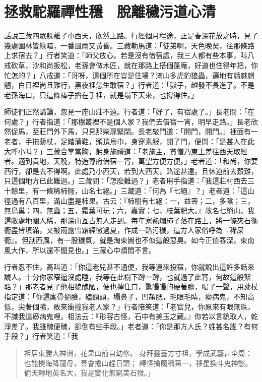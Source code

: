 
\chapter{拯救駝羅禪性穩　脫離穢污道心清}

話說三藏四眾躲離了小西天，欣然上路。行經個月程途，正是春深花放之時，見了幾處園林皆綠暗，一番風雨又黃昏。三藏勒馬道：「徒弟啊，天色晚矣，往那條路上求宿去？」行者笑道：「師父放心。若是沒有借宿處，我三人都有些本事，叫八戒砍草，沙和尚扳松，老孫會做木匠，就在那路上搭個蓬庵，好道也住得年把，你忙怎的？」八戒道：「哥呀，這個所在豈是住場？滿山多虎豹狼蟲，遍地有魑魅魍魎，白日裡尚且難行，黑夜裡怎生敢宿？」行者道：「獃子，越發不長進了。不是老孫海口，只這條棒子揝在手裡，就是塌下天來，也撐得住。」

師徒們正然講論，忽見一座山莊不遠。行者道：「好了，有宿處了。」長老問：「在何處？」行者指道：「那樹叢裡不是個人家？我們去借宿一宵，明早走路。」長老欣然促馬，至莊門外下馬，只見那柴扉緊閉。長老敲門道：「開門，開門。」裡面有一老者，手拖藜杖，足踏蒲鞋，頭頂烏巾，身穿素服，開了門，便問：「是甚人在此大呼小叫？」三藏合掌當胸，躬身施禮道：「老施主，貧僧乃東土差往西天取經者。適到貴地，天晚，特造尊府借宿一宵，萬望方便方便。」老者道：「和尚，你要西行，卻是去不得啊。此處乃小西天，若到大西天，路途甚遠。且休道前去艱難，只這個地方已此難過。」三藏問：「怎麼難過？」老者用手指道：「我這莊村西去三十餘里，有一條稀柿衕，山名七絕。」三藏道：「何為『七絕』？」老者道：「這山徑過有八百里，滿山盡是柿果。古云：『柿樹有七絕：一，益壽；二，多陰；三，無鳥巢；四，無蟲；五，霜葉可玩；六，嘉實；七，枝葉肥大。』故名七絕山。我這敝處地闊人稀，那深山亙古無人走到。每年家熟爛柿子落在路上，將一條夾石衚衕盡皆填滿，又被雨露雪霜經黴過夏，作成一路污穢，這方人家俗呼為『稀屎衕』。但刮西風，有一股穢氣，就是淘東圊也不似這般惡臭。如今正值春深，東南風大作，所以還不聞見也。」三藏心中煩悶不言。

行者忍不住，高叫道：「你這老兒甚不通便，我等遠來投宿，你就說出這許多話來諕人。十分你家窄逼沒處睡，我等在此樹下蹲一蹲，也就過了此宵，何故這般絮聒？」那老者見了他相貌醜陋，便也擰住口，驚嘬嘬的硬著膽，喝了一聲，用藜杖指定道：「你這廝骨撾臉，磕額頭，塌鼻子，凹頡腮，毛眼毛睛，癆病鬼，不知高低，尖著個嘴，敢來衝撞我老人家？」行者陪笑道：「老官兒，你原來有眼無珠，不識我這癆病鬼哩。相法云：『形容古怪，石中有美玉之藏。』你若以言貌取人，乾淨差了。我雖醜便醜，卻倒有些手段。」老者道：「你是那方人氏？姓甚名誰？有何手段？」行者笑道：「我
\begin{quote}
祖居東勝大神洲，花果山前自幼修。
身拜靈臺方寸祖，學成武藝甚全周：
也能攪海降龍母，善會擔山趕日頭；
縛怪擒魔稱第一，移星換斗鬼神愁。
偷天轉地英名大，我是變化無窮美石猴。」
\end{quote}

